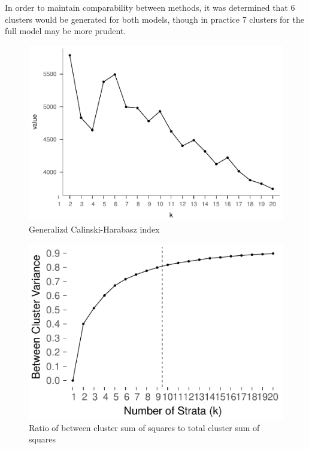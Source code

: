 \documentclass[,man]{apa6}
\theoremstyle{definition}
\theoremstyle{definition}
\theoremstyle{definition}
\theoremstyle{remark}
\begin{document}
In order to maintain comparability between methods, it was determined
that 6 clusters would be generated for both models, though in practice 7
clusters for the full model may be more prudent.

\begin{figure}
\centering
\includegraphics{Method_files/figure-latex/ch-full-1.pdf}
\caption{\label{fig:ch-full}Generalizd Calinski-Harabasz index}
\end{figure}

\begin{figure}
\centering
\includegraphics{Method_files/figure-latex/ratio-full-1.pdf}
\caption{\label{fig:ratio-full}Ratio of between cluster sum of squares to
total cluster sum of squares}
\end{figure}
\end{document}

